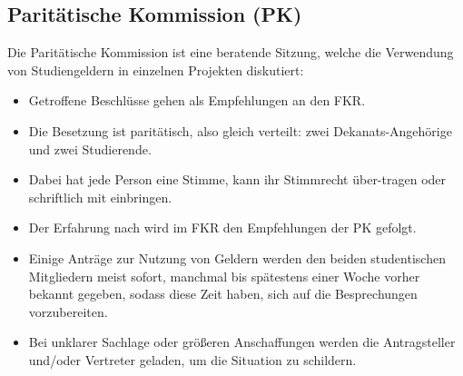 \subsection{Paritätische Kommission (PK)}
Die Paritätische Kommission ist eine beratende Sitzung, welche die 
Verwendung von Studiengeldern in einzelnen Projekten diskutiert:
\begin{itemize}
\item Getroffene Beschlüsse gehen als Empfehlungen an den FKR. 
\item Die Besetzung ist paritätisch, also gleich verteilt: zwei Dekanats-Angehörige und zwei Studierende. 
\item Dabei hat jede Person eine Stimme, kann ihr Stimmrecht über-tragen 
oder schriftlich mit einbringen. 
\item Der Erfahrung nach wird im FKR den Empfehlungen der PK gefolgt. 
\item Einige Anträge zur Nutzung von Geldern werden den beiden 
studentischen Mitgliedern meist sofort, manchmal bis spätestens 
einer Woche vorher bekannt gegeben, sodass diese Zeit haben, sich 
auf die Besprechungen vorzubereiten. 
\item Bei unklarer Sachlage oder größeren Anschaffungen werden die 
Antragsteller und/oder Vertreter geladen, um die Situation zu 
schildern.
\end{itemize}